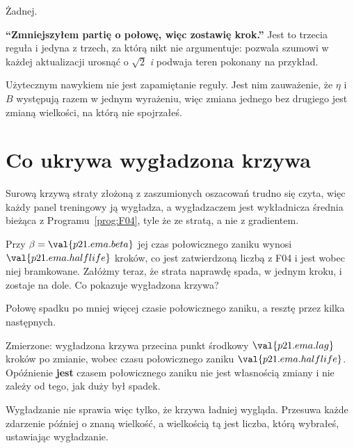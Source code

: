 \begin{fr}
\begin{ansblock}
Żadnej.
\end{ansblock}

\begin{trapbox}
\textbf{\enquote{Zmniejszyłem partię o połowę, więc zostawię krok.}} Jest to
trzecia reguła i jedyna z trzech, za którą nikt nie argumentuje: pozwala
szumowi w każdej aktualizacji urosnąć o $\sqrt{2}$ \emph{i} podwaja teren
pokonany na przykład.

Użytecznym nawykiem nie jest zapamiętanie reguły. Jest nim zauważenie, że
$\eta$ i $B$ występują razem w jednym wyrażeniu, więc zmiana jednego bez
drugiego jest zmianą wielkości, na którą nie spojrzałeś.
\end{trapbox}
\end{fr}

\section{Co ukrywa wygładzona krzywa}
\label{sec:P21-smoothing}

\begin{fr}
Surową krzywą straty złożoną z zaszumionych oszacowań trudno się czyta, więc
każdy panel treningowy ją wygładza, a wygładzaczem jest wykładnicza średnia
bieżąca z Programu~\ref{prog:F04}, tyle że ze stratą, a nie z gradientem.

Przy $\beta = \val{p21.ema.beta}$ jej czas połowicznego zaniku wynosi
$\val{p21.ema.halflife}$ kroków, co jest zatwierdzoną liczbą z F04 i jest
wobec niej bramkowane. Załóżmy teraz, że strata naprawdę spada, w jednym kroku,
i zostaje na dole. Co pokazuje wygładzona krzywa?
\dotline
\nextframe
\end{fr}

\begin{fr}
\begin{ansblock}
Połowę spadku po mniej więcej czasie połowicznego zaniku, a resztę przez kilka
następnych.
\end{ansblock}

Zmierzone: wygładzona krzywa przecina punkt środkowy $\val{p21.ema.lag}$ kroków
po zmianie, wobec czasu połowicznego zaniku $\val{p21.ema.halflife}$.
Opóźnienie \textbf{jest} czasem połowicznego zaniku \dash{} nie jest własnością
zmiany i nie zależy od tego, jak duży był spadek.

Wygładzanie nie sprawia więc tylko, że krzywa ładniej wygląda. Przesuwa każde
zdarzenie później o znaną wielkość, a wielkością tą jest liczba, którą wybrałeś,
ustawiając wygładzanie.
\end{fr}

